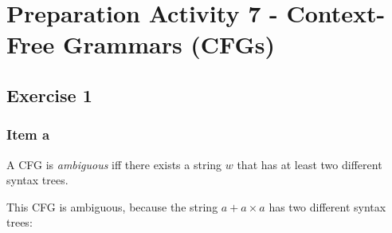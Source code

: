 \documentclass[docid=PA07]{tcom_PA}
\begin{document}
\setcounter{section}{6}
\section{Preparation Activity 7 - Context-Free Grammars (CFGs)}
{
\renewcommand{\thesubsubsection}{\thesubsection\alph{subsubsection}}
\newcommand{\lmd}{\xRightarrow[lm]{}}
\subsection{Exercise 1}
\subsubsection{Item a}
\begin{definition}
A CFG is \textit{ambiguous} iff there exists a string $w$ that has at least two different syntax trees.
\end{definition}
This CFG is ambiguous, because the string $a+a \times a$ has two different syntax trees:
\begin{center}
\begin{minipage}{0.4\linewidth}
	\begin{center}
	\end{center}
\end{minipage}
\begin{minipage}{0.4\linewidth}
	\begin{center}
	\end{center}
\end{minipage}
\end{center}
}
\end{document}

